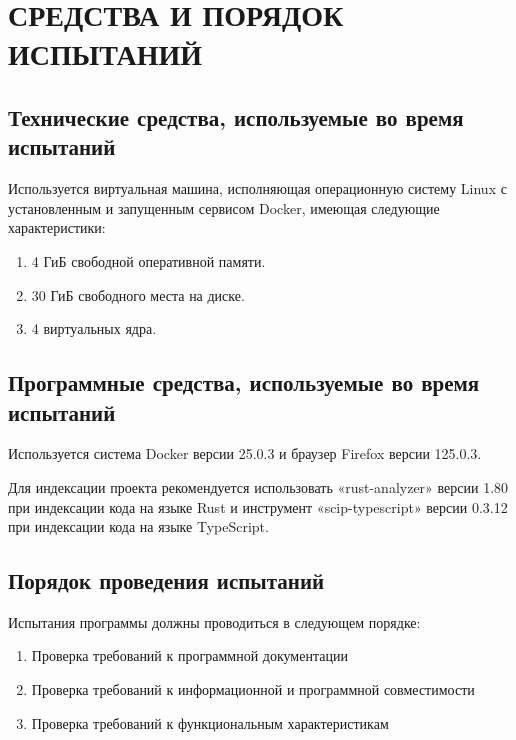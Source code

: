 \section{СРЕДСТВА И ПОРЯДОК ИСПЫТАНИЙ}

\subsection{Технические средства, используемые во время испытаний}
    Используется виртуальная машина, исполняющая операционную систему Linux с установленным и запущенным сервисом Docker, имеющая следующие характеристики:
    \begin{enumerate}
        \item 4 ГиБ свободной оперативной памяти.
        \item 30 ГиБ свободного места на диске.
        \item 4 виртуальных ядра.
    \end{enumerate}

\subsection{Программные средства, используемые во время испытаний}
    Используется система Docker версии 25.0.3 и браузер Firefox версии 125.0.3.
    
    Для индексации проекта рекомендуется использовать «rust-analyzer» версии 1.80 при индексации кода на языке Rust и инструмент «scip-typescript» версии 0.3.12 при индексации кода на языке TypeScript. 

\subsection{Порядок проведения испытаний}
    Испытания программы должны проводиться в следующем порядке:
    \begin{enumerate}
        \item Проверка требований к программной документации
        \item Проверка требований к информационной и программной совместимости
        \item Проверка требований к функциональным характеристикам
    \end{enumerate}

\clearpage